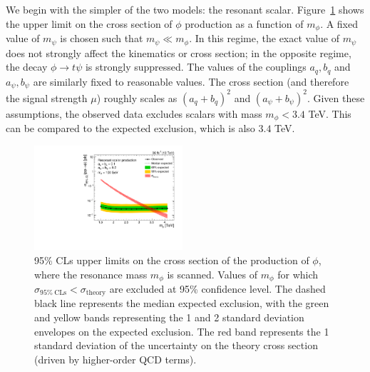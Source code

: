 We begin with the simpler of the two models: the resonant scalar. 
Figure~\ref{fig:mt:res_obs} shows the upper limit on the cross section of $\phi$ production as a function of $m_\phi$.
A fixed value of $m_\psi$ is chosen such that $m_\psi \ll m_\phi$. 
In this regime, the exact value of $m_\psi$ does not strongly affect the kinematics or cross section; in the opposite regime, the decay $\phi\rightarrow t\psi$ is strongly suppressed. 
The values of the couplings $a_q,b_q$ and $a_\psi,b_\psi$ are similarly fixed to reasonable values.
The cross section (and therefore the signal strength $\mu$) roughly scales as $(a_q+b_q)^2$ and $(a_\psi+b_\psi)^2$. 
Given these assumptions, the observed data excludes scalars with mass $m_\phi < 3.4$ TeV.
This can be compared to the expected exclusion, which is also $3.4$ TeV.

\begin{figure}[]
    \begin{center}
        \includegraphics[width=0.49\textwidth]{figures/monotop/results/res_obs_limit.pdf}
        \caption{95\% CLs upper limits on the cross section of the production of $\phi$, where the resonance mass $m_\phi$ is scanned.
                 Values of $m_\phi$ for which $\sigma_{95\%~\mathrm{CLs}} < \sigma_\mathrm{theory}$ are excluded at 95\% confidence level.
                 The dashed black line represents the median expected exclusion, with the green and yellow bands representing the 1 and 2 standard deviation envelopes on the expected exclusion.
                 The red band represents the 1 standard deviation of the uncertainty on the theory cross section (driven by higher-order QCD terms). }
        \label{fig:mt:res_obs}
    \end{center}
\end{figure}

